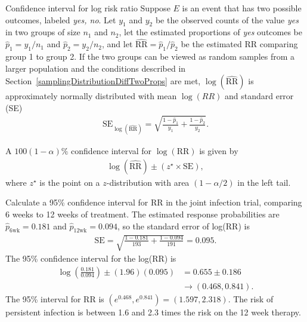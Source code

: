 \begin{onebox}{Confidence interval for log risk ratio}
  Suppose $E$ is an event that has two possible outcomes, labeled \textit{yes, no}. Let $y_1$ and $y_2$ be the observed counts of the value \textit{yes} in two groups of size $n_1$ and $n_2$, let the estimated proportions of \textit{yes} outcomes be $\hat{p}_1 = y_1/n_1$ and $\hat{p}_2 = y_2/n_2$, and let $\widehat{\text{RR}} = \hat{p}_1/\hat{p}_2$ be the estimated RR comparing group 1 to group 2.  If the two groups can be viewed as random samples from a larger population and the conditions described in Section~\ref{samplingDistributionDiffTwoProps} are met,  $\log(\widehat{\text{RR}})$ is approximately normally distributed with mean  $\log(RR)$ and standard error (SE)
  \begin{align*}
  \text{SE}_{\log(\widehat{\text{RR}})} = \sqrt{\frac{1 - \hat{p}_1}{y_1} + \frac{1 - \hat{p}_2}{y_2}}.
  \end{align*}

  A $100(1  - \alpha)\%$ confidence interval for $\log(\text{RR})$ is given by
\begin{align}
  \log(\widehat{\text{RR}}) \pm (z^{\star} \times \text{SE}),
  \label{eqn:confidenceIntervalRR}
\end{align}
where $z^{\star}$ is the point on a $z$-distribution with area $(1 - \alpha/2)$ in the left tail.
\end{onebox}

\begin{examplewrap}
\begin{nexample}{Calculate a 95\% confidence interval for RR in the joint infection trial, comparing 6 weeks to 12 weeks of treatment.}\label{ex:jointInfectionRRCI}
The estimated response probabilities are $\hat{p}_{\text{6wk}} = 0.181$ and
$\hat{p}_{\text{12wk}} = 0.094$, so the standard error of log(RR) is
\begin{align*}
    \text{SE} = \sqrt{\frac{1 - 0.181}{193} + \frac{1 - 0.094}{191}} = 0.095.
  \end{align*}
The 95\% confidence interval for the log(RR) is
\begin{align*}
\log\left(\frac{0.181}{0.094}\right) \pm (1.96)(0.095) &= 0.655 \pm 0.186\\
&\to (0.468, 0.841).
\end{align*}
The 95\% interval for RR is $(e^{0.468}, e^{0.841}) = (1.597, 2.318)$. The risk of persistent infection is between 1.6 and 2.3 times the risk on the 12 week therapy.
\end{nexample}
\end{examplewrap}

